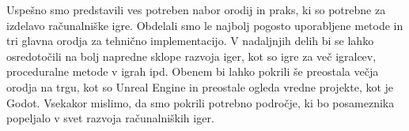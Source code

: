\documentclass[12pt,a4paper,twoside]{book}
\begin{document}
Uspešno smo predstavili ves potreben nabor orodij in praks, ki so potrebne za izdelavo računalniške igre. Obdelali smo le najbolj pogosto uporabljene metode in tri glavna orodja za tehnično implementacijo. V nadaljnjih delih bi se lahko osredotočili na bolj napredne sklope razvoja iger, kot so igre za več igralcev, proceduralne metode v igrah ipd. Obenem bi lahko pokrili še preostala večja orodja na trgu, kot so Unreal Engine in preostale ogleda vredne projekte, kot je Godot. Vsekakor mislimo, da smo pokrili potrebno področje, ki bo posameznika popeljalo v svet razvoja računalniških iger.

\cleardoublepage
{}


\end{document}
